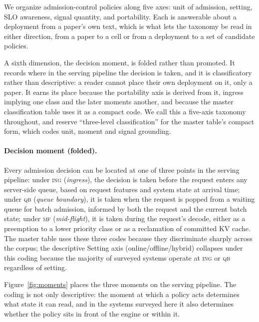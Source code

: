 We organize admission-control policies along five axes: unit of
admission, setting, SLO awareness, signal quantity, and portability.
Each is answerable about a deployment from a paper's own text, which is
what lets the taxonomy be read in either direction, from a paper to a
cell or from a deployment to a set of candidate policies.

A sixth dimension, the decision moment, is folded rather than
promoted. It records where in the serving pipeline the decision is
taken, and it is classificatory rather than descriptive: a reader
cannot place their own deployment on it, only a paper. It earns its
place because the portability axis is derived from it, ingress
implying one class and the later moments another, and because the
master classification table uses it as a compact code. We call this a
five-axis taxonomy throughout, and reserve ``three-level
classification'' for the master table's compact form, which codes unit,
moment and signal grounding.

\paragraph{Decision moment (folded).} Every admission decision can
be located at one of three points in the serving pipeline:
under \textsc{ing} (\emph{ingress}), the decision is taken before the
request enters any server-side queue, based on request features and
system state at arrival time; under \textsc{qb} (\emph{queue
boundary}), it is taken when the request is popped from a waiting
queue for batch admission, informed by both the request and the
current batch state; under \textsc{mf} (\emph{mid-flight}), it is
taken during the request's decode, either as a preemption to a
lower priority class or as a reclamation of committed KV cache. The
master table uses these three codes because they discriminate
sharply across the corpus; the descriptive Setting axis
(online/offline/hybrid) collapses under this coding because the
majority of surveyed systems operate at \textsc{ing} or \textsc{qb}
regardless of setting.

Figure~\ref{fig:moments} places the three moments on the serving
pipeline. The coding is not only descriptive: the moment at which a
policy acts determines what state it can read, and in the systems
surveyed here it also determines whether the policy sits in front of
the engine or within it.

